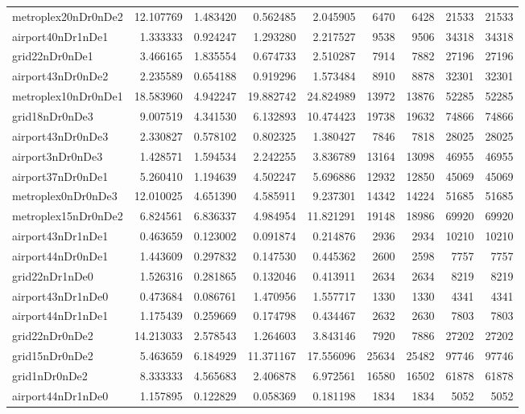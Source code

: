 \begin{longtable}{|l|r|r|r|r|r|r|r|r|}
metroplex20nDr0nDe2 & 12.107769 & 1.483420 & 0.562485 & 2.045905 & 6470 & 6428 & 21533 & 21533 \\
airport40nDr1nDe1 & 1.333333 & 0.924247 & 1.293280 & 2.217527 & 9538 & 9506 & 34318 & 34318 \\
grid22nDr0nDe1 & 3.466165 & 1.835554 & 0.674733 & 2.510287 & 7914 & 7882 & 27196 & 27196 \\
airport43nDr0nDe2 & 2.235589 & 0.654188 & 0.919296 & 1.573484 & 8910 & 8878 & 32301 & 32301 \\
metroplex10nDr0nDe1 & 18.583960 & 4.942247 & 19.882742 & 24.824989 & 13972 & 13876 & 52285 & 52285 \\
grid18nDr0nDe3 & 9.007519 & 4.341530 & 6.132893 & 10.474423 & 19738 & 19632 & 74866 & 74866 \\
airport43nDr0nDe3 & 2.330827 & 0.578102 & 0.802325 & 1.380427 & 7846 & 7818 & 28025 & 28025 \\
airport3nDr0nDe3 & 1.428571 & 1.594534 & 2.242255 & 3.836789 & 13164 & 13098 & 46955 & 46955 \\
airport37nDr0nDe1 & 5.260410 & 1.194639 & 4.502247 & 5.696886 & 12932 & 12850 & 45069 & 45069 \\
metroplex0nDr0nDe3 & 12.010025 & 4.651390 & 4.585911 & 9.237301 & 14342 & 14224 & 51685 & 51685 \\
metroplex15nDr0nDe2 & 6.824561 & 6.836337 & 4.984954 & 11.821291 & 19148 & 18986 & 69920 & 69920 \\
airport43nDr1nDe1 & 0.463659 & 0.123002 & 0.091874 & 0.214876 & 2936 & 2934 & 10210 & 10210 \\
airport44nDr0nDe1 & 1.443609 & 0.297832 & 0.147530 & 0.445362 & 2600 & 2598 & 7757 & 7757 \\
grid22nDr1nDe0 & 1.526316 & 0.281865 & 0.132046 & 0.413911 & 2634 & 2634 & 8219 & 8219 \\
airport43nDr1nDe0 & 0.473684 & 0.086761 & 1.470956 & 1.557717 & 1330 & 1330 & 4341 & 4341 \\
airport44nDr1nDe1 & 1.175439 & 0.259669 & 0.174798 & 0.434467 & 2632 & 2630 & 7803 & 7803 \\
grid22nDr0nDe2 & 14.213033 & 2.578543 & 1.264603 & 3.843146 & 7920 & 7886 & 27202 & 27202 \\
grid15nDr0nDe2 & 5.463659 & 6.184929 & 11.371167 & 17.556096 & 25634 & 25482 & 97746 & 97746 \\
grid1nDr0nDe2 & 8.333333 & 4.565683 & 2.406878 & 6.972561 & 16580 & 16502 & 61878 & 61878 \\
airport44nDr1nDe0 & 1.157895 & 0.122829 & 0.058369 & 0.181198 & 1834 & 1834 & 5052 & 5052 \\

\end{longtable}
